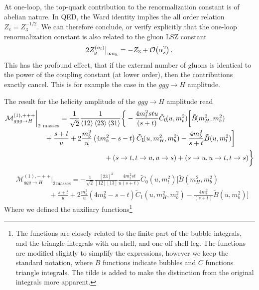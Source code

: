 At one-loop, the top-quark contribution to the renormalization constant is of abelian nature. In \acs{QED}, the Ward identity implies the all order relation $Z_e = Z_3^{-1/2}$. We can therefore conclude, or verify explicitly that the one-loop renormalization constant is also related to the gluon LSZ constant
\begin{equation}
2 Z_g^{(n_l)} \big \vert_{\propto n_h} = - Z_3 + \mathcal{O}\!\left(\alpha_s^2\right).
\end{equation}
This has the profound effect, that if the external number of gluons is identical to the power of the coupling constant (at lower order), then the contributions exactly cancel. This is for example the case in the $ggg \rightarrow H$ amplitude.

The result for the helicity amplitude of the $ggg \rightarrow H$ amplitude read
\begin{equation}
\begin{split}
&\mathcal{M}^{(1),+++}_{ggg \rightarrow H} \bigg \vert_{2\ \text{masses}} = \frac{1}{\sqrt{2}} \frac{1}{\braket{12}\braket{23} \braket{31}} \bigg \lbrace -  \frac{4 m_t^2 s t u}{(s + t)} \tilde{C}_0\!(u, m_t^2) \bigg [ \tilde{B}\!(m_H^2, m_b^2)  \\
& \hspace{2cm} + \frac{s + t}{u} + 2 \frac{m_b^2}{u} \left( 4 m_b^2 - s - t \right) \tilde{C}_1\!(u, m_H^2, m_b^2) - \frac{4 m_b^2}{s + t} \tilde{B}(u, m_l^2)  \bigg ] \\
& \hspace{5cm} + (s \rightarrow t, t \rightarrow u, u \rightarrow s) + (s \rightarrow u, u \rightarrow t, t \rightarrow s)\bigg \rbrace
\label{eq:5:ggg_ppp}
\end{split}
\end{equation}
%
%
\begin{equation}
\begin{split}
&\mathcal{M}^{(1),-++}_{ggg \rightarrow H} \bigg \vert_{2\, \text{masses}} = -\frac{1}{\sqrt{2}} \frac{[23]^3}{[12][13]} \frac{4 m_t^2 s t }{u(s + t)} \tilde{C}_0\!(u, m_t^2) \bigg [ \tilde{B}\!(m_H^2, m_b^2) \\
& \hspace{2cm} + \frac{s + t}{u} + 2 \frac{m_b^2}{u} \left(4 m_b^2 - s - t\right) \tilde{C}_1\!(u, m_H^2, m_b^2) - \frac{4 m_b^2}{(s + t)} \tilde{B}\!(u, m_b^2) \bigg ]
\label{eq:5:ggg_mpp}
\end{split}
\end{equation}
Where we defined the auxiliary functions\footnote{The functions are closely related to the finite part of the bubble integrals, and the triangle integrals with on-shell, and one off-shell leg. The functions are modified slightly to simplify the expressions, however we keep the standard notation, where $B$ functions indicate bubbles and $C$ functions triangle integrals. The tilde is added to make the distinction from the original integrals more apparent.}
